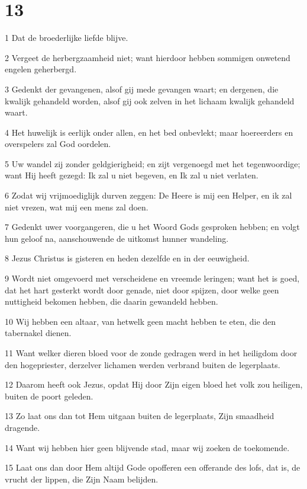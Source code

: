 \chapter{13}

\par 1 Dat de broederlijke liefde blijve.
\par 2 Vergeet de herbergzaamheid niet; want hierdoor hebben sommigen onwetend engelen geherbergd.
\par 3 Gedenkt der gevangenen, alsof gij mede gevangen waart; en dergenen, die kwalijk gehandeld worden, alsof gij ook zelven in het lichaam kwalijk gehandeld waart.
\par 4 Het huwelijk is eerlijk onder allen, en het bed onbevlekt; maar hoereerders en overspelers zal God oordelen.
\par 5 Uw wandel zij zonder geldgierigheid; en zijt vergenoegd met het tegenwoordige; want Hij heeft gezegd: Ik zal u niet begeven, en Ik zal u niet verlaten.
\par 6 Zodat wij vrijmoediglijk durven zeggen: De Heere is mij een Helper, en ik zal niet vrezen, wat mij een mens zal doen.
\par 7 Gedenkt uwer voorgangeren, die u het Woord Gods gesproken hebben; en volgt hun geloof na, aanschouwende de uitkomst hunner wandeling.
\par 8 Jezus Christus is gisteren en heden dezelfde en in der eeuwigheid.
\par 9 Wordt niet omgevoerd met verscheidene en vreemde leringen; want het is goed, dat het hart gesterkt wordt door genade, niet door spijzen, door welke geen nuttigheid bekomen hebben, die daarin gewandeld hebben.
\par 10 Wij hebben een altaar, van hetwelk geen macht hebben te eten, die den tabernakel dienen.
\par 11 Want welker dieren bloed voor de zonde gedragen werd in het heiligdom door den hogepriester, derzelver lichamen werden verbrand buiten de legerplaats.
\par 12 Daarom heeft ook Jezus, opdat Hij door Zijn eigen bloed het volk zou heiligen, buiten de poort geleden.
\par 13 Zo laat ons dan tot Hem uitgaan buiten de legerplaats, Zijn smaadheid dragende.
\par 14 Want wij hebben hier geen blijvende stad, maar wij zoeken de toekomende.
\par 15 Laat ons dan door Hem altijd Gode opofferen een offerande des lofs, dat is, de vrucht der lippen, die Zijn Naam belijden.
